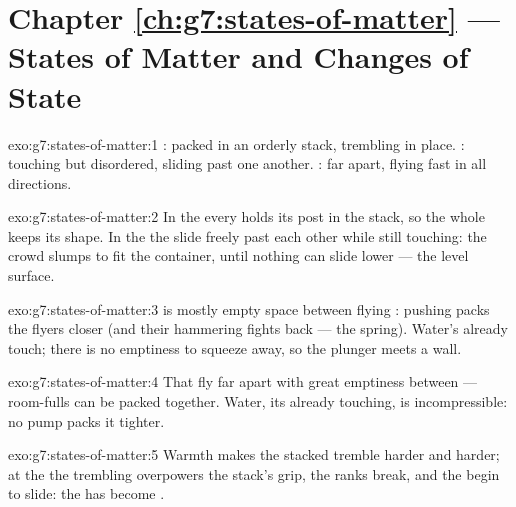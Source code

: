 \section*{Chapter \ref{ch:g7:states-of-matter} --- States of Matter and Changes of State}

\begin{solution}{exo:g7:states-of-matter:1}
:  packed in an orderly stack, trembling in place.
:  touching but disordered, sliding past one
another. :  far apart, flying fast in all directions.
\end{solution}

\begin{solution}{exo:g7:states-of-matter:2}
In the  every  holds its post in the stack, so the
whole keeps its shape. In the  the  slide freely
past each other while still touching: the crowd slumps to fit the
container, until nothing can slide lower --- the level surface.
\end{solution}

\begin{solution}{exo:g7:states-of-matter:3}
 is mostly empty space between flying : pushing packs
the flyers closer (and their hammering fights back --- the
spring). Water's  already touch; there is no emptiness to
squeeze away, so the plunger meets a wall.
\end{solution}

\begin{solution}{exo:g7:states-of-matter:4}
That   fly far apart with great emptiness between ---
room-fulls can be packed together. Water, its  already
touching, is incompressible: no pump packs it tighter.
\end{solution}

\begin{solution}{exo:g7:states-of-matter:5}
Warmth makes the stacked  tremble harder and harder; at
the  the trembling overpowers the stack's grip, the
ranks break, and the  begin to slide: the  has
become .
\end{solution}

